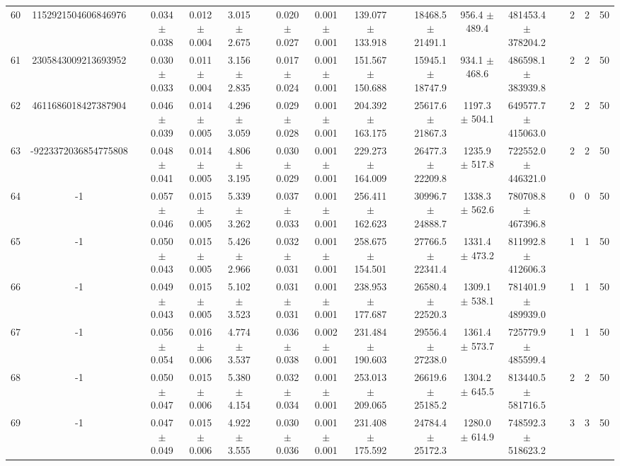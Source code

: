 \documentclass[11pt]{article}
\begin{document}
\begin{landscape}
\begin{table}
\begin{tabular}{cccccccccccccccccc}
60 & 1152921504606846976 &&  0.034 $\pm$ 0.038 & 0.012 $\pm$ 0.004 & 3.015 $\pm$ 2.675 &&  0.020 $\pm$ 0.027 & 0.001 $\pm$ 0.001 & 139.077 $\pm$ 133.918 &&  18468.5 $\pm$ 21491.1 & 956.4 $\pm$ 489.4 & 481453.4 $\pm$ 378204.2 && 2& 2& 50\\
61 & 2305843009213693952 &&  0.030 $\pm$ 0.033 & 0.011 $\pm$ 0.004 & 3.156 $\pm$ 2.835 &&  0.017 $\pm$ 0.024 & 0.001 $\pm$ 0.001 & 151.567 $\pm$ 150.688 &&  15945.1 $\pm$ 18747.9 & 934.1 $\pm$ 468.6 & 486598.1 $\pm$ 383939.8 && 2& 2& 50\\
62 & 4611686018427387904 &&  0.046 $\pm$ 0.039 & 0.014 $\pm$ 0.005 & 4.296 $\pm$ 3.059 &&  0.029 $\pm$ 0.028 & 0.001 $\pm$ 0.001 & 204.392 $\pm$ 163.175 &&  25617.6 $\pm$ 21867.3 & 1197.3 $\pm$ 504.1 & 649577.7 $\pm$ 415063.0 && 2& 2& 50\\
63 & -9223372036854775808 &&  0.048 $\pm$ 0.041 & 0.014 $\pm$ 0.005 & 4.806 $\pm$ 3.195 &&  0.030 $\pm$ 0.029 & 0.001 $\pm$ 0.001 & 229.273 $\pm$ 164.009 &&  26477.3 $\pm$ 22209.8 & 1235.9 $\pm$ 517.8 & 722552.0 $\pm$ 446321.0 && 2& 2& 50\\
64 &      -1 &&  0.057 $\pm$ 0.046 & 0.015 $\pm$ 0.005 & 5.339 $\pm$ 3.262 &&  0.037 $\pm$ 0.033 & 0.001 $\pm$ 0.001 & 256.411 $\pm$ 162.623 &&  30996.7 $\pm$ 24888.7 & 1338.3 $\pm$ 562.6 & 780708.8 $\pm$ 467396.8 && 0& 0& 50\\
65 &      -1 &&  0.050 $\pm$ 0.043 & 0.015 $\pm$ 0.005 & 5.426 $\pm$ 2.966 &&  0.032 $\pm$ 0.031 & 0.001 $\pm$ 0.001 & 258.675 $\pm$ 154.501 &&  27766.5 $\pm$ 22341.4 & 1331.4 $\pm$ 473.2 & 811992.8 $\pm$ 412606.3 && 1& 1& 50\\
66 &      -1 &&  0.049 $\pm$ 0.043 & 0.015 $\pm$ 0.005 & 5.102 $\pm$ 3.523 &&  0.031 $\pm$ 0.031 & 0.001 $\pm$ 0.001 & 238.953 $\pm$ 177.687 &&  26580.4 $\pm$ 22520.3 & 1309.1 $\pm$ 538.1 & 781401.9 $\pm$ 489939.0 && 1& 1& 50\\
67 &      -1 &&  0.056 $\pm$ 0.054 & 0.016 $\pm$ 0.006 & 4.774 $\pm$ 3.537 &&  0.036 $\pm$ 0.038 & 0.002 $\pm$ 0.001 & 231.484 $\pm$ 190.603 &&  29556.4 $\pm$ 27238.0 & 1361.4 $\pm$ 573.7 & 725779.9 $\pm$ 485599.4 && 1& 1& 50\\
68 &      -1 &&  0.050 $\pm$ 0.047 & 0.015 $\pm$ 0.006 & 5.380 $\pm$ 4.154 &&  0.032 $\pm$ 0.034 & 0.001 $\pm$ 0.001 & 253.013 $\pm$ 209.065 &&  26619.6 $\pm$ 25185.2 & 1304.2 $\pm$ 645.5 & 813440.5 $\pm$ 581716.5 && 2& 2& 50\\
69 &      -1 &&  0.047 $\pm$ 0.049 & 0.015 $\pm$ 0.006 & 4.922 $\pm$ 3.555 &&  0.030 $\pm$ 0.036 & 0.001 $\pm$ 0.001 & 231.408 $\pm$ 175.592 &&  24784.4 $\pm$ 25172.3 & 1280.0 $\pm$ 614.9 & 748592.3 $\pm$ 518623.2 && 3& 3& 50\\

\end{tabular}
\end{table}
\end{landscape}
\end{document}
